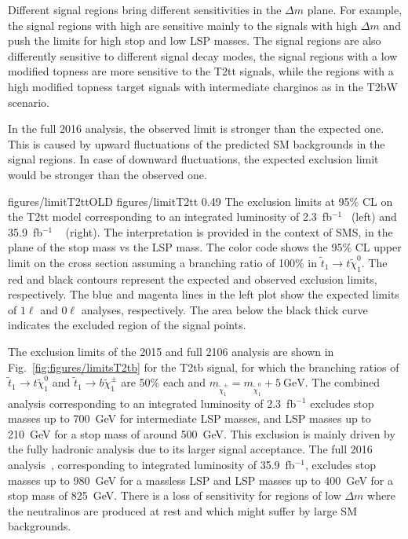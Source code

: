 Different signal regions bring different sensitivities in the $\Delta m$ plane. For example, the signal regions with high \MET are sensitive mainly to the signals with high $\Delta m$ and push the limits for high stop and low LSP masses. The signal regions are also differently sensitive to different signal decay modes, the signal regions with a low modified topness are more sensitive to the T2tt signals,  while the regions with a high modified topness  target signals with intermediate charginos as in the T2bW scenario. 

In the full 2016 analysis, the observed limit is stronger than the expected one. This is caused by upward fluctuations of the predicted SM backgrounds in the signal regions. In case of downward fluctuations, the expected exclusion limit would be stronger than the observed one.

                 {figures/limitT2ttOLD} %
                 {figures/limitT2tt} %
                 {0.49}       %
                 { The exclusion limits at 95\% CL on the T2tt model corresponding to an integrated luminosity of 2.3~fb$^{-1}$~\cite{Sirunyan:2016jpr} (left) and   35.9~fb$^{-1}$ ~\cite{Sirunyan:2017xse} (right). The interpretation is provided in the context of SMS, in the plane of the stop mass vs the LSP mass. The color code shows the 95\% CL upper limit on the cross section assuming a branching ratio of 100\% in $ \tilde{t}_{1} \to t  \tilde{\chi}^{0}_{1} $. The red and black contours represent the expected and observed exclusion limits, respectively. The blue and magenta lines in the left plot show the expected limits of $1 \ell$ and $0 \ell$ analyses, respectively.  The area below the black thick curve indicates the excluded region of the signal points.  }

The exclusion limits of the 2015 \cite{Sirunyan:2016jpr} and full 2106 analysis  \cite{Sirunyan:2017xse} are shown in Fig.~\ref{fig:figures/limitsT2tb} for the T2tb signal, for which the branching ratios of $ \tilde{t}_{1} \to t  \tilde{\chi}^{0}_{1} $ and $ \tilde{t}_{1} \to b  \tilde{\chi}^{\pm}_{1} $  are 50\% each and $m_{\tilde{\chi}_{1}^{\pm}} = m_{\tilde{\chi}_{1}^{0}} + 5~\mathrm{GeV}$. The combined analysis  corresponding to an integrated luminosity of 2.3~fb$^{-1}$ excludes stop masses up to 700~GeV for intermediate LSP masses, and  LSP masses up to 210~GeV for a stop mass of around 500~GeV. This exclusion is mainly driven by the fully hadronic analysis due to its larger signal acceptance. The full 2016 analysis~\cite{Sirunyan:2017xse}, corresponding to integrated luminosity of 35.9~fb$^{-1}$, excludes stop masses up to 980~GeV for a massless LSP and LSP masses up to 400~GeV for a stop mass of 825~GeV. There is a loss of sensitivity for regions of low $\Delta m$  where the neutralinos are produced at rest and which might suffer by large SM backgrounds.

